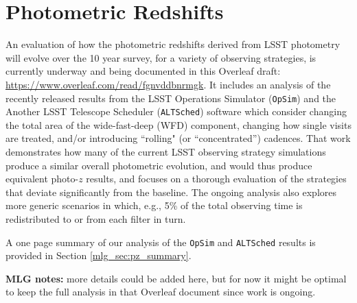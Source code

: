 \section{Photometric Redshifts}\label{sec:pz}

An evaluation of how the photometric redshifts derived from LSST photometry will evolve over the 10 year survey, for a variety of observing strategies, is currently underway and being documented in this Overleaf draft: \url{https://www.overleaf.com/read/fgnvddbnrmgk}. It includes an analysis of the recently released results from the LSST Operations Simulator ({\tt OpSim}) and the Another LSST Telescope Scheduler ({\tt ALTSched}) software which consider changing the total area of the wide-fast-deep (WFD) component, changing how single visits are treated, and/or introducing ``rolling" (or ``concentrated'') cadences. That work demonstrates how many of the current LSST observing strategy simulations produce a similar overall photometric evolution, and would thus produce equivalent photo-$z$ results, and focuses on a thorough evaluation of the strategies that deviate significantly from the baseline. The ongoing analysis also explores more generic scenarios in which, e.g., 5\% of the total observing time is redistributed to or from each filter in turn.

A one page summary of our analysis of the {\tt OpSim} and {\tt ALTSched} results is provided in Section \ref{mlg_sec:pz_summary}. 

{\bf MLG notes:} more details could be added here, but for now it might be optimal to keep the full analysis in that Overleaf document since work is ongoing.
